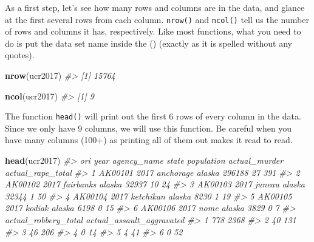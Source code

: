 \documentclass[
  12pt,
]{book}
\newenvironment{Shaded}{\begin{snugshade}}{\end{snugshade}}
\newcommand{\CommentTok}[1]{\textcolor[rgb]{0.56,0.35,0.01}{\textit{#1}}}
\newcommand{\KeywordTok}[1]{\textcolor[rgb]{0.13,0.29,0.53}{\textbf{#1}}}
\newcommand{\NormalTok}[1]{#1}
\begin{document}
As a first step, let's see how many rows and columns are in the data, and glance at the first several rows from each column. \texttt{nrow()} and \texttt{ncol()} tell us the number of rows and columns it has, respectively. Like most functions, what you need to do is put the data set name inside the () (exactly as it is spelled without any quotes).

\begin{Shaded}
\begin{Highlighting}[]
\KeywordTok{nrow}\NormalTok{(ucr2017)}
\CommentTok{\#> [1] 15764}
\end{Highlighting}
\end{Shaded}

\begin{Shaded}
\begin{Highlighting}[]
\KeywordTok{ncol}\NormalTok{(ucr2017)}
\CommentTok{\#> [1] 9}
\end{Highlighting}
\end{Shaded}

The function \texttt{head()} will print out the first 6 rows of every column in the data. Since we only have 9 columns, we will use this function. Be careful when you have many columns (100+) as printing all of them out makes it read to read.

\begin{Shaded}
\begin{Highlighting}[]
\KeywordTok{head}\NormalTok{(ucr2017)}
\CommentTok{\#>       ori year agency\_name  state population actual\_murder actual\_rape\_total}
\CommentTok{\#> 1 AK00101 2017   anchorage alaska     296188            27               391}
\CommentTok{\#> 2 AK00102 2017   fairbanks alaska      32937            10                24}
\CommentTok{\#> 3 AK00103 2017      juneau alaska      32344             1                50}
\CommentTok{\#> 4 AK00104 2017   ketchikan alaska       8230             1                19}
\CommentTok{\#> 5 AK00105 2017      kodiak alaska       6198             0                15}
\CommentTok{\#> 6 AK00106 2017        nome alaska       3829             0                 7}
\CommentTok{\#>   actual\_robbery\_total actual\_assault\_aggravated}
\CommentTok{\#> 1                  778                      2368}
\CommentTok{\#> 2                   40                       131}
\CommentTok{\#> 3                   46                       206}
\CommentTok{\#> 4                    0                        14}
\CommentTok{\#> 5                    4                        41}
\CommentTok{\#> 6                    0                        52}
\end{Highlighting}
\end{Shaded}
\end{document}
